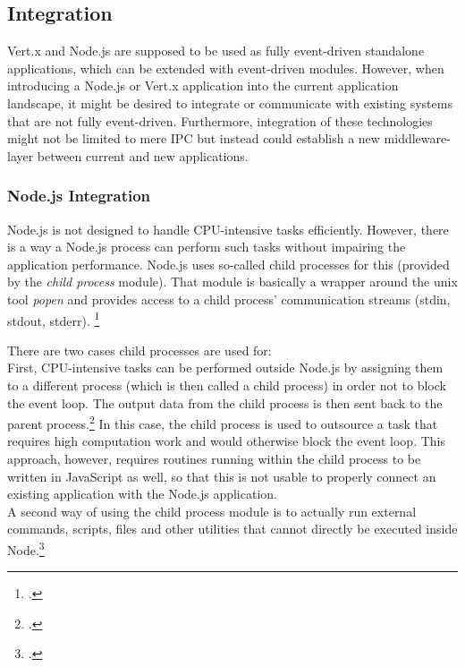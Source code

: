 \subsection{Integration}
\label{integration}
Vert.x and Node.js are supposed to be used as fully event-driven standalone
applications, which can be extended with event-driven modules.
However, when introducing a Node.js or Vert.x application into the current
application landscape, it might be desired to integrate or communicate with existing
systems that are not fully event-driven. Furthermore, integration of these
technologies might not be limited to mere IPC but instead could establish a new middleware-layer between current and new
applications.\\

\subsubsection{Node.js Integration}
\label{node_integration}
Node.js is not designed to handle CPU-intensive tasks efficiently. However,
there is a way a Node.js process can perform such tasks without impairing the
application performance. Node.js uses so-called child processes for this
(provided by the \textit{child process}
module). That module is basically a wrapper around the unix tool \textit{popen} and
provides access to a child process' communication streams (stdin, stdout, stderr).
\footcite[Cf.][]{node_child_process}

There are two cases child processes are used for:\\
First, CPU-intensive tasks can be performed outside Node.js by assigning them to a
different process (which is then called a child process) in order not to block
the event loop. The output data from the child process is then sent back to the
parent process.\footcite[Cf.][63]{teixeira_2012} In this case, the child process is used to
outsource a task that requires high computation work and would otherwise block
the event loop. This approach, however, requires routines running
within the child process to be written in JavaScript as well, so that this is not
usable to properly connect an existing application with the Node.js application.\\
A second way of using the child process module is to actually run external
commands, scripts, files and other utilities that cannot directly be executed inside Node.\footcite[Cf.][63]{teixeira_2012}

